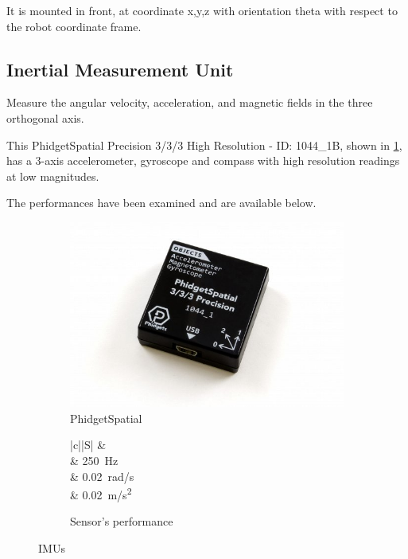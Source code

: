 It is mounted in front, at coordinate x,y,z with orientation theta with respect to the robot coordinate frame.

\subsection{Inertial Measurement Unit}

\noindent Measure the angular velocity, acceleration, and magnetic fields in the three orthogonal axis.

This PhidgetSpatial Precision 3/3/3 High Resolution - ID: 1044\_1B, shown in \ref{fig:spatial}, has a 3-axis accelerometer, gyroscope and compass with high resolution readings at low magnitudes.

The performances have been examined and are available below.

\begin{figure}[!ht]
	\begin{center}
		\begin{subfigure}[b]{.5\textwidth}
			\begin{center}
				\includegraphics[width=1\textwidth]{Images/4-Methods/1044_1B.jpg}
			\end{center}
			\caption{PhidgetSpatial}
			\label{fig:spatial}
		\end{subfigure}
		\begin{subfigure}[b]{.45\textwidth}
			\begin{center}
				\label{tab:evalPhiIMU}
				\begin{tabular}{|c||S|}
					\hline
					 &   \\
					\hline
					\hline
					 &  \SI{250}{Hz} \\
					\hline
					\centering{$\boldsymbol \eta_{\omega}$} & \SI{0.02}{\radian/\second} \\
					\hline
					 & \SI{0.02}{\meter/\second \squared} \\
					\hline
				\end{tabular}
				\caption{Sensor's performance}
			\end{center}
		\end{subfigure}%
		\caption{\glspl{IMU}}
		\label{fig:imusensorphi}
	\end{center}
\end{figure}

